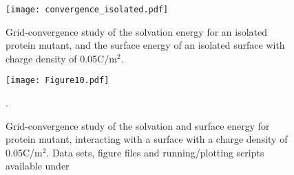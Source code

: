 \begin{figure}%
   \centering
   \texttt{[image: convergence\_isolated.pdf]} 
   \caption{Grid-convergence study of the solvation energy for an isolated protein \gb mutant, and the surface energy of an isolated surface with charge density of 0.05C/m$^2$.}
   \label{fig:convergence_1PGB_isolated}
\end{figure}

\begin{figure}[h] %
   \centering
   \texttt{[image: Figure10.pdf]} 
   \caption{Grid-convergence study of the solvation and surface energy for protein \gb mutant, interacting with a surface with a charge density of 0.05C/m$^2$. Data sets, figure files and running/plotting scripts available under \ccby \cite{CooperBarba2015-share1348803}}.
   \label{fig:convergence_1PGB_sensor}
\end{figure}

